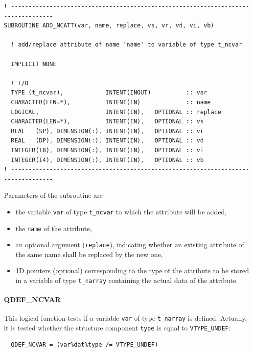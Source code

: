 \documentclass[11pt,twoside]{article}
\begin{document}
\begin{verbatim}
! ----------------------------------------------------------------------------------
SUBROUTINE ADD_NCATT(var, name, replace, vs, vr, vd, vi, vb)

  ! add/replace attribute of name 'name' to variable of type t_ncvar

  IMPLICIT NONE

  ! I/O
  TYPE (t_ncvar),            INTENT(INOUT)          :: var
  CHARACTER(LEN=*),          INTENT(IN)             :: name
  LOGICAL,                   INTENT(IN),   OPTIONAL :: replace
  CHARACTER(LEN=*),          INTENT(IN),   OPTIONAL :: vs
  REAL   (SP), DIMENSION(:), INTENT(IN),   OPTIONAL :: vr
  REAL   (DP), DIMENSION(:), INTENT(IN),   OPTIONAL :: vd
  INTEGER(I8), DIMENSION(:), INTENT(IN),   OPTIONAL :: vi
  INTEGER(I4), DIMENSION(:), INTENT(IN),   OPTIONAL :: vb
! ----------------------------------------------------------------------------------
\end{verbatim}

Parameters of the subroutine are
\begin{itemize}
\item the variable \verb|var| of type \verb|t_ncvar| to which the attribute
will be added,
\item the \verb|name| of the attribute,
\item an optional argument (\verb|replace|), indicating whether an existing
 attribute of the same name shall be replaced by the new one, 
\item 1D pointers (optional) corresponding to the type
of the attribute to be stored in a variable of type \verb|t_narray|
containing the actual data of the attribute. 
\end{itemize}

\paragraph{QDEF\_NCVAR\\ \label{QDVAR}}
This logical function tests if a variable \verb|var| of
 type \verb|t_narray| is defined. Actually, it is tested whether
 the structure component \verb|type| is equal to \verb|VTYPE_UNDEF|:

\begin{verbatim}
  QDEF_NCVAR = (var%dat%type /= VTYPE_UNDEF)
\end{verbatim}
\end{document}

